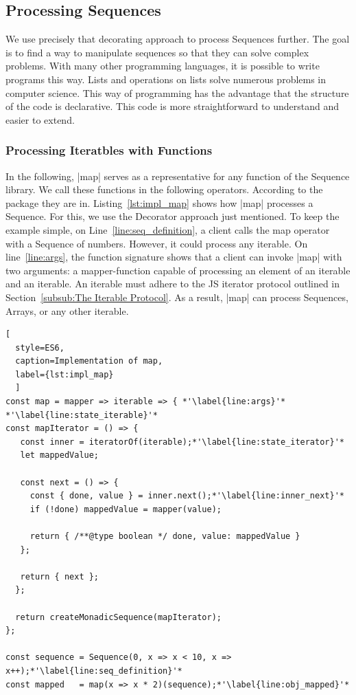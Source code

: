 \subsection{Processing Sequences}
\label{sec:Processing Sequences}
We use precisely that decorating approach to process Sequences further. 
The goal is to find a way to manipulate sequences so that they can solve 
complex problems. With many other programming languages, it is possible to write 
programs this way. Lists and operations on lists solve numerous problems in 
computer science. This way of programming has the advantage that the structure 
of the code is declarative. This code is more straightforward to understand 
and easier to extend.

\subsubsection{Processing Iteratbles with Functions}
\label{subsub:Processing Iteratbles with Functions}
In the following, |map| serves as a representative for any function of the
Sequence library. We call these functions in the following operators.
According to the package they are in.
Listing~\ref{lst:impl_map} shows how |map| processes a 
Sequence. For this, we use the Decorator approach just mentioned. To keep the 
example simple, on Line~\ref{line:seq_definition}, a client calls the map 
operator with a Sequence of numbers. However, it could process any iterable.
\newline
On line~\ref{line:args}, the function signature shows that a client can invoke 
|map| with two arguments: a mapper-function capable of processing an element of 
an iterable and an iterable. An iterable must adhere to the JS iterator protocol 
outlined in Section~\ref{subsub:The Iterable Protocol}. As a result, |map| can 
process Sequences, Arrays, or any other iterable. 

\begin{lstlisting}[
  style=ES6, 
  caption=Implementation of map,
  label={lst:impl_map}
  ]
const map = mapper => iterable => { *'\label{line:args}'*
*'\label{line:state_iterable}'*
const mapIterator = () => {
   const inner = iteratorOf(iterable);*'\label{line:state_iterator}'*
   let mappedValue;
 
   const next = () => {
     const { done, value } = inner.next();*'\label{line:inner_next}'*
     if (!done) mappedValue = mapper(value);
 
     return { /**@type boolean */ done, value: mappedValue }
   };
 
   return { next };
  };
 
  return createMonadicSequence(mapIterator);
};

const sequence = Sequence(0, x => x < 10, x => x++);*'\label{line:seq_definition}'*
const mapped   = map(x => x * 2)(sequence);*'\label{line:obj_mapped}'*
\end{lstlisting}

